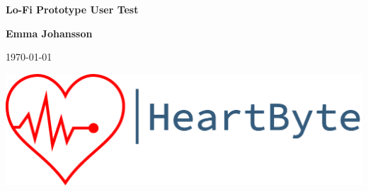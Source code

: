 \begin{titlepage}
   \begin{center}
       \vspace*{1cm}
       \Huge
       \textbf{Lo-Fi Prototype User Test}
        
       \Large
       
            
       \vspace{2cm}

       \textbf{Emma Johansson}
       
	   \vspace{1.5cm}
        
       \today
   
	   \vfill
	   \includegraphics[width=\linewidth]{Pictures/logo_heartbyte_transparent_v_1_1 (1)}

   	   \vfill
            
   \end{center}
\end{titlepage}
